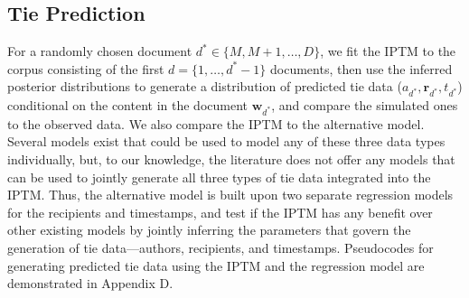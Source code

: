 \documentclass[twoside]{article}
\begin{document}
\subsection{Tie Prediction}\label{subsec:Tie Prediction}
 For a randomly chosen document $d^* \in \{M, M+1,\ldots, D\}$, we fit the IPTM to the corpus consisting of the first $d = \{1,\hdots,d^*-1\}$ documents, then use the inferred posterior distributions to generate a distribution of predicted tie data ($a_{d^*}, \boldsymbol{r}_{d^*}, t_{d^*}$) conditional on the content in the document $\boldsymbol{w}_{d^*}$, and compare the simulated ones to the observed data. We also compare the IPTM to the alternative model. Several models exist that could be used to model any of these three data types individually, but, to our knowledge, the literature does not offer any models that can be used to jointly generate all three types of tie data integrated into the IPTM. Thus, the alternative model is built upon two separate regression models for the recipients and timestamps, and test if the IPTM has any benefit over other existing models by jointly inferring the parameters that govern the generation of tie data---authors, recipients, and timestamps. Pseudocodes for generating predicted tie data using the IPTM and the regression model are demonstrated in Appendix D.
 
\end{document}
